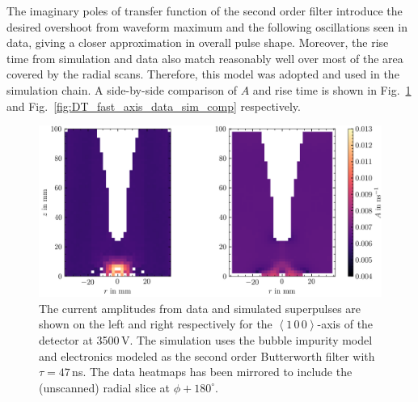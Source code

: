 The imaginary poles of transfer function of the second order filter introduce the desired overshoot from waveform maximum and the following oscillations seen in data, giving a closer approximation in overall pulse shape. Moreover, the rise time from simulation and data also match reasonably well over most of the area covered by the radial scans. Therefore, this model was adopted and used in the simulation chain. A side-by-side comparison of $A$ and rise time is shown in Fig.~\ref{fig:AOE_fast_axis_data_sim_comp} and Fig.~\ref{fig:DT_fast_axis_data_sim_comp} respectively. 
\begin{figure}[H]
    \centering
    \includegraphics[width=6in]{figs/sim/AOE_fast_axis_data_sim_comp.png}
    \caption{The current amplitudes from data and simulated superpulses are shown on the left and right respectively for the $\left<1\,0\,0\right>$-axis of the detector at 3500\,V. The simulation uses the bubble impurity model and electronics modeled as the second order Butterworth filter with $\tau = 47$\,ns. The data heatmaps has been mirrored to include the (unscanned) radial slice at $\phi+180^\circ$.}
    \label{fig:AOE_fast_axis_data_sim_comp}
\end{figure}


